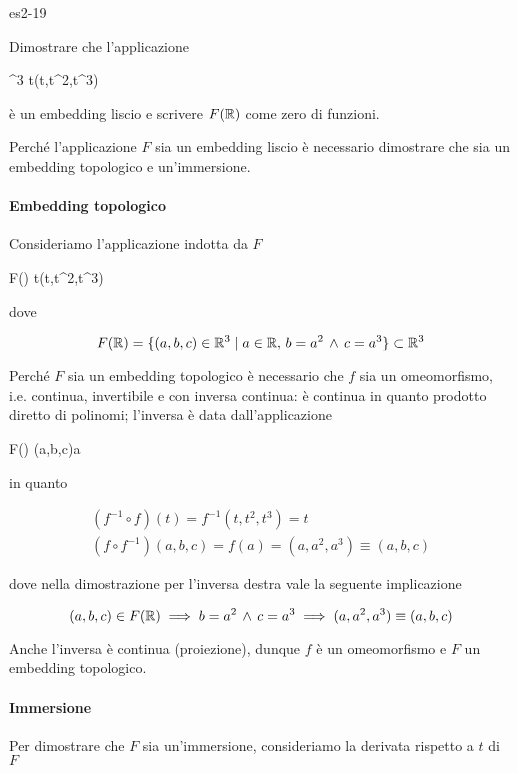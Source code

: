 {es2-19}
{
Dimostrare che l'applicazione

	{\R}{\R^{3}}
	{t}{(t,t^{2},t^{3})}

è un embedding liscio e scrivere $ F(\mathbb{R}) $ come zero di funzioni.
}
{
Perché l'applicazione $ F $ sia un embedding liscio è necessario dimostrare che sia un embedding topologico e un'immersione.

\paragraph{Embedding topologico}

Consideriamo l'applicazione indotta da $ F $

	{\R}{F(\R)}
	{t}{(t,t^{2},t^{3})}

dove

\begin{equation}
	F(\mathbb{R}) = \{ (a,b,c) \in \mathbb{R}^{3} \mid a \in \mathbb{R} , \, b = a^{2} \, \wedge \, c = a^{3} \} \subset \mathbb{R}^{3}
\end{equation}

Perché $ F $ sia un embedding topologico è necessario che $ f $ sia un omeomorfismo, i.e. continua, invertibile e con inversa continua: è continua in quanto prodotto diretto di polinomi; l'inversa è data dall'applicazione

	{F(\R)}{\R}
	{(a,b,c)}{a}

in quanto

\begin{gather}
	(f^{-1} \circ f) (t) = f^{-1}(t,t^{2},t^{3}) = t \\
	(f \circ f^{-1}) (a,b,c) = f(a) = (a,a^{2},a^{3}) \equiv (a,b,c)
\end{gather}

dove nella dimostrazione per l'inversa destra vale la seguente implicazione

\begin{equation}
	(a,b,c) \in F(\R) %
	\implies %
	b = a^{2} \, \wedge \, c = a^{3} %
	\implies %
	(a,a^{2},a^{3}) \equiv (a,b,c)
\end{equation}

Anche l'inversa è continua (proiezione), dunque $ f $ è un omeomorfismo e $ F $ un embedding topologico.

\paragraph{Immersione}

Per dimostrare che $ F $ sia un'immersione, consideriamo la derivata rispetto a $ t $ di $ F $

}
